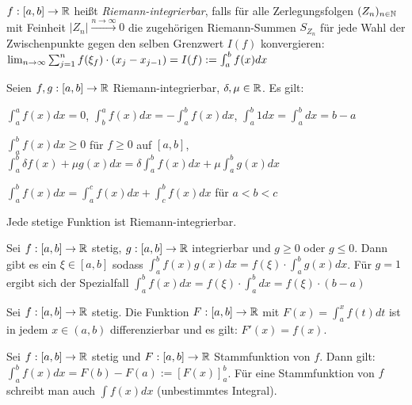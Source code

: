 \begin{definition}
	$f : [a,b] \rightarrow \mathbb{R}$ heißt \emph{Riemann-integrierbar}, falls für alle Zerlegungsfolgen $(Z_n)_{n \in \mathbb{N}}$ mit Feinheit $|Z_n| \overset{n \rightarrow \infty}{\rightarrow} 0$ die zugehörigen Riemann-Summen $S_{Z_n}$ für jede Wahl der Zwischenpunkte gegen den selben Grenzwert $I(f)$ konvergieren: $\lim_{n \rightarrow \infty} \sum_{j=1}^n f(\xi_f) \cdot (x_j - x_{j-1}) = I(f) := \int_{a}^{b}f(x) dx$
\end{definition}

\begin{satz}
	Seien $f,g : [a,b] \rightarrow \mathbb{R}$ Riemann-integrierbar, $\delta, \mu \in \mathbb{R}$. Es gilt:
	\begin{description}[noitemsep]
		\item $\int_{a}^{a} f(x) dx = 0$, $\int_{b}^{a} f(x) dx = - \int_{a}^{b} f(x) dx$, $\int_{a}^{b} 1 dx = \int_{a}^{b} dx = b - a$
		\item $\int_{a}^{b} f(x) dx \geq 0$ für $f \geq 0$ auf $[a,b]$, $\int_{a}^{b} \delta f(x) + \mu g(x) dx = \delta \int_{a}^{b}f(x) dx + \mu \int_{a}^{b} g(x) dx$
		\item $\int_{a}^{b} f(x) dx = \int_{a}^{c} f(x) dx + \int_{c}^{b} f(x) dx$ für $a < b < c$
	\end{description} 
\end{satz}

\begin{satz}
	Jede stetige Funktion ist Riemann-integrierbar.
\end{satz}

\begin{satz}
	Sei $f : [a,b] \rightarrow \mathbb{R}$ stetig, $g : [a,b] \rightarrow \mathbb{R}$ integrierbar und $g \geq 0$ oder $g \leq 0$. Dann gibt es ein $\xi \in [a,b]$ sodass $\int_{a}^{b}f(x)g(x) dx = f(\xi) \cdot \int_{a}^{b} g(x) dx$. Für $g=1$ ergibt sich der Spezialfall $\int_{a}^{b}f(x)dx = f(\xi) \cdot \int_{a}^{b} dx = f(\xi) \cdot (b - a)$
\end{satz}

\begin{satz}
	Sei $f : [a,b] \rightarrow \mathbb{R}$ stetig. Die Funktion $F : [a,b] \rightarrow \mathbb{R}$ mit $F(x) = \int_{a}^{x} f(t) dt$ ist in jedem $x \in (a,b)$ differenzierbar und es gilt: $F'(x) = f(x)$.
\end{satz}

\begin{satz}
	Sei $f : [a,b] \rightarrow \mathbb{R}$ stetig und $F : [a,b] \rightarrow \mathbb{R}$ Stammfunktion von $f$. Dann gilt: $\int_{a}^{b}f(x)dx = F(b) - F(a) := [F(x)]_a^b$. Für eine Stammfunktion von $f$ schreibt man auch $\int f(x) dx$ (unbestimmtes Integral).
\end{satz}

